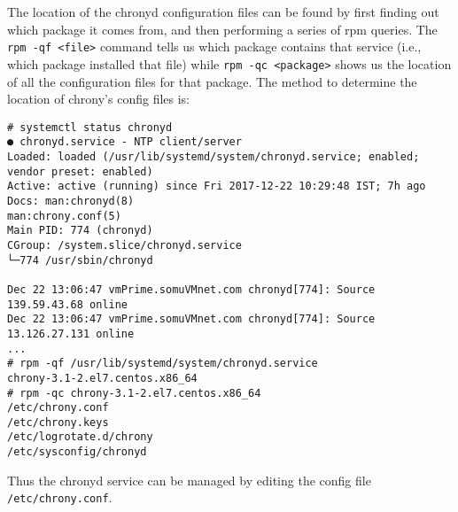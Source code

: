 \noindent
The location of the chronyd configuration files can be found by first finding out which package it comes from, and then performing a series of rpm queries. The \verb|rpm -qf <file>| command tells us which package contains that service (i.e., which package installed that file) while \verb|rpm -qc <package>| shows us the location of all the configuration files for that package. The method to determine the location of chrony's config files is:

\vspace{-15pt}
\begin{verbatim}
# systemctl status chronyd
● chronyd.service - NTP client/server
Loaded: loaded (/usr/lib/systemd/system/chronyd.service; enabled; vendor preset: enabled)
Active: active (running) since Fri 2017-12-22 10:29:48 IST; 7h ago
Docs: man:chronyd(8)
man:chrony.conf(5)
Main PID: 774 (chronyd)
CGroup: /system.slice/chronyd.service
└─774 /usr/sbin/chronyd

Dec 22 13:06:47 vmPrime.somuVMnet.com chronyd[774]: Source 139.59.43.68 online
Dec 22 13:06:47 vmPrime.somuVMnet.com chronyd[774]: Source 13.126.27.131 online
...
# rpm -qf /usr/lib/systemd/system/chronyd.service
chrony-3.1-2.el7.centos.x86_64
# rpm -qc chrony-3.1-2.el7.centos.x86_64
/etc/chrony.conf
/etc/chrony.keys
/etc/logrotate.d/chrony
/etc/sysconfig/chronyd
\end{verbatim}
\vspace{-10pt}

\noindent
Thus the chronyd service can be managed by editing the config file \verb|/etc/chrony.conf|.